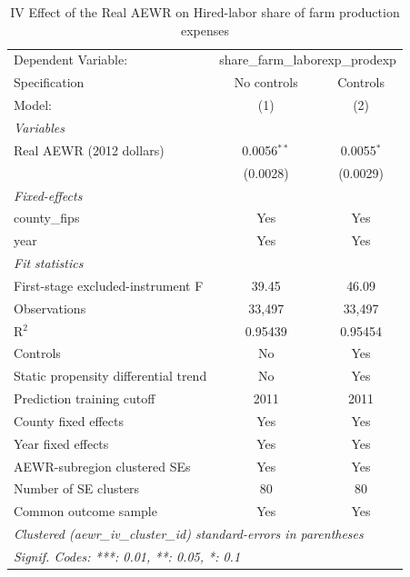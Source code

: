 
\begin{table}[htbp]
   \caption{\label{tab:iv_farm_labor_share} IV Effect of the Real AEWR on Hired-labor share of farm production expenses}
   \centering
   \begin{tabular}{lcc}
      \tabularnewline \midrule \midrule
      Dependent Variable: & \multicolumn{2}{c}{share\_farm\_laborexp\_prodexp}\\
      Specification                        & No controls   & Controls \\
      Model:                               & (1)           & (2)\\
      \midrule
      \emph{Variables}\\
      Real AEWR (2012 dollars)             & 0.0056$^{**}$ & 0.0055$^{*}$\\
                                           & (0.0028)      & (0.0029)\\
      \midrule
      \emph{Fixed-effects}\\
      county\_fips                         & Yes           & Yes\\
      year                                 & Yes           & Yes\\
      \midrule
      \emph{Fit statistics}\\
      First-stage excluded-instrument F    & 39.45         & 46.09\\
      Observations                         & 33,497        & 33,497\\
      R$^2$                                & 0.95439       & 0.95454\\
      Controls                             & No            & Yes\\
      Static propensity differential trend & No            & Yes\\
      Prediction training cutoff           & 2011          & 2011\\
      County fixed effects                 & Yes           & Yes\\
      Year fixed effects                   & Yes           & Yes\\
      AEWR-subregion clustered SEs         & Yes           & Yes\\
      Number of SE clusters                & 80            & 80\\
      Common outcome sample                & Yes           & Yes\\
      \midrule \midrule
      \multicolumn{3}{l}{\emph{Clustered (aewr\_iv\_cluster\_id) standard-errors in parentheses}}\\
      \multicolumn{3}{l}{\emph{Signif. Codes: ***: 0.01, **: 0.05, *: 0.1}}\\
   \end{tabular}


\end{table}
